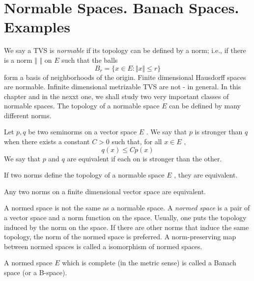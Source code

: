 \section{Normable Spaces. Banach Spaces. Examples}

We say a TVS is \textit{normable} if its topology can be defined by a norm; i.e., if there is a norm $ \Vert \hspace{4pt} \Vert $ on $ E $ such that the balls 
\[
	B_{ r } = \{ x \in E: \Vert x \Vert \leq r \}
\]
form a basis of neighborhoods of the origin. Finite dimensional Hausdorff spaces are normable. Infinite dimensional metrizable TVS are not - in general. In this chapter and in the nexxt one, we shall study two very important classes of normable spaces. The topology of a normable space $ E $ can be defined by many different norms.

\begin{defn}
	Let $ p,q $ be two seminorms on a vector space $ E $ . We say that $ p $ is stronger than $ q $ when there exists a constant $ C > 0 $ such that, for all $ x \in E $ , 
	\[
		q(x) \leq C p(x)
	\]
We say that $ p $ and $ q $ are equivalent if each on is stronger than the other.
	
\end{defn}

\begin{prop}
	If two norms define the topology of a normable space $ E $ , they are equivalent.
\end{prop}

\begin{cor}
	Any two norms on a finite dimensional vector space are equivalent.
\end{cor}

A normed space is not the same as a normable space. A \textit{normed space} is a pair of a vector space and a norm function on the space. Usually, one puts the topology induced by the norm on the space. If there are other norms that induce the same topology, the norm of the normed space is preferred. A norm-preserving map between normed spaces is called a isomorphism of normed spaces.

\begin{defn}
	A normed space $ E $ which is complete (in the metric sense) is called a Banach space (or a B-space).
\end{defn}

